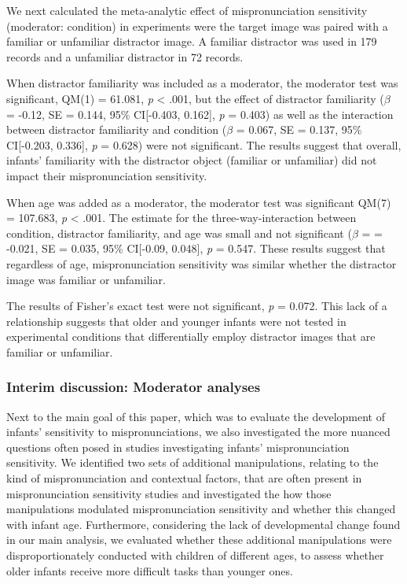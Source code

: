 \documentclass[man]{apa6}
\begin{document}
We next calculated the meta-analytic effect of mispronunciation sensitivity (moderator: condition) in experiments were the target image was paired with a familiar or unfamiliar distractor image. A familiar distractor was used in 179 records and a unfamiliar distractor in 72 records.

When distractor familiarity was included as a moderator, the moderator test was significant, QM(1) = 61.081, \emph{p} \textless{} .001, but the effect of distractor familiarity (\(\beta\) = -0.12, SE = 0.144, 95\% CI{[}-0.403, 0.162{]}, \emph{p} = 0.403) as well as the interaction between distractor familiarity and condition (\(\beta\) = 0.067, SE = 0.137, 95\% CI{[}-0.203, 0.336{]}, \emph{p} = 0.628) were not significant. The results suggest that overall, infants' familiarity with the distractor object (familiar or unfamiliar) did not impact their mispronunciation sensitivity.

When age was added as a moderator, the moderator test was significant QM(7) = 107.683, \emph{p} \textless{} .001. The estimate for the three-way-interaction between condition, distractor familiarity, and age was small and not significant (\(\beta\) = = -0.021, SE = 0.035, 95\% CI{[}-0.09, 0.048{]}, \emph{p} = 0.547. These results suggest that regardless of age, mispronunciation sensitivity was similar whether the distractor image was familiar or unfamiliar.

The results of Fisher's exact test were not significant, \emph{p} = 0.072. This lack of a relationship suggests that older and younger infants were not tested in experimental conditions that differentially employ distractor images that are familiar or unfamiliar.

\hypertarget{interim-discussion-moderator-analyses}{%
\subsubsection{Interim discussion: Moderator analyses}\label{interim-discussion-moderator-analyses}}

Next to the main goal of this paper, which was to evaluate the development of infants' sensitivity to mispronunciations, we also investigated the more nuanced questions often posed in studies investigating infants' mispronunciation sensitivity. We identified two sets of additional manipulations, relating to the kind of mispronunciation and contextual factors, that are often present in mispronunciation sensitivity studies and investigated the how those manipulations modulated mispronunciation sensitivity and whether this changed with infant age. Furthermore, considering the lack of developmental change found in our main analysis, we evaluated whether these additional manipulations were disproportionately conducted with children of different ages, to assess whether older infants receive more difficult tasks than younger ones.
\end{document}
